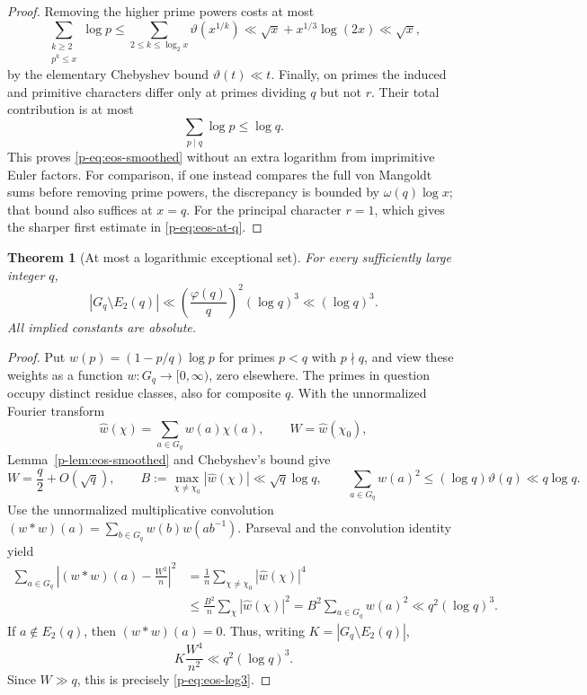 \documentclass[11pt,a4paper]{article}
\newtheorem{theorem}{Theorem}[section]
\theoremstyle{definition}
\theoremstyle{remark}
\begin{document}
\begin{proof}
Removing the higher prime powers costs at most
\[
 \sum_{\substack{k\geq2\\p^k\leq x}}\log p
 \leq\sum_{2\leq k\leq\log_2x}\vartheta(x^{1/k})
 \ll\sqrt x+x^{1/3}\log(2x)\ll\sqrt x,
\]
by the elementary Chebyshev bound $\vartheta(t)\ll t$.
Finally, on primes the induced and primitive characters differ only
at primes dividing $q$ but not $r$. Their total contribution is at most
\[
 \sum_{p\mid q}\log p\leq\log q.
\]
This proves \eqref{p-eq:eos-smoothed} without an extra logarithm from
imprimitive Euler factors. For comparison, if one instead compares
the full von Mangoldt sums before removing prime powers, the discrepancy
is bounded by $\omega(q)\log x$; that bound also suffices at $x=q$.
For the principal character $r=1$, which gives the sharper first
estimate in \eqref{p-eq:eos-at-q}.
\end{proof}

\begin{theorem}[At most a logarithmic exceptional set]\label{p-thm:eos-log3}
For every sufficiently large integer $q$,
\begin{equation}\label{p-eq:eos-log3}
 |G_q\setminus E_2(q)|
 \ll\left(\frac{\varphi(q)}q\right)^2(\log q)^3
 \ll(\log q)^3.
\end{equation}
All implied constants are absolute.
\end{theorem}

\begin{proof}
Put $w(p)=(1-p/q)\log p$ for primes $p<q$ with $p\nmid q$, and
view these weights as a function $w:G_q\to[0,\infty)$, zero elsewhere.
The primes in question occupy distinct residue classes, also for
composite $q$. With the unnormalized Fourier transform
\[
 \widehat w(\chi)=\sum_{a\in G_q}w(a)\chi(a),
 \qquad W=\widehat w(\chi_0),
\]
Lemma~\ref{p-lem:eos-smoothed} and Chebyshev's bound give
\[
 W=\frac q2+O(\sqrt q),\qquad
 B:=\max_{\chi\ne\chi_0}|\widehat w(\chi)|\ll\sqrt q\log q,
 \qquad
 \sum_{a\in G_q}w(a)^2
 \leq(\log q)\vartheta(q)\ll q\log q.
\]
Use the unnormalized multiplicative convolution
$(w*w)(a)=\sum_{b\in G_q}w(b)w(ab^{-1})$.
Parseval and the convolution identity yield
\begin{align*}
 \sum_{a\in G_q}\left|(w*w)(a)-\frac{W^2}{n}\right|^2
 &=\frac1n\sum_{\chi\ne\chi_0}|\widehat w(\chi)|^4\\
 &\leq\frac{B^2}{n}\sum_\chi|\widehat w(\chi)|^2
  =B^2\sum_{a\in G_q}w(a)^2
  \ll q^2(\log q)^3.
\end{align*}
If $a\notin E_2(q)$, then $(w*w)(a)=0$. Thus, writing
$K=|G_q\setminus E_2(q)|$,
\[
 K\frac{W^4}{n^2}\ll q^2(\log q)^3.
\]
Since $W\gg q$, this is precisely \eqref{p-eq:eos-log3}.
\end{proof}
\end{document}
